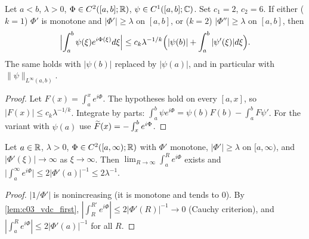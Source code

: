\begin{lemma}
  \label{lem:c03_vdc_interval_amplitude}
  Let $a<b$, $\lambda>0$, $\Phi\in C^2([a,b];\mathbb{R})$, $\psi\in C^1([a,b];\mathbb{C})$. Set $c_1=2$, $c_2=6$. If either ($k=1$) $\Phi'$ is monotone and $|\Phi'|\ge\lambda$ on $[a,b]$, or ($k=2$) $|\Phi''|\ge\lambda$ on $[a,b]$, then
  \[
    \Bigl|\int_a^b\psi(\xi)e^{i\Phi(\xi)}d\xi\Bigr|\le c_k\lambda^{-1/k}\Bigl(|\psi(b)|+\int_a^b|\psi'(\xi)|d\xi\Bigr).
  \]
  The same holds with $|\psi(b)|$ replaced by $|\psi(a)|$, and in particular with $\|\psi\|_{L^\infty(a,b)}$.
\end{lemma}
\begin{proof}
  Let $F(x)=\int_a^xe^{i\Phi}$. The hypotheses hold on every $[a,x]$, so $|F(x)|\le c_k\lambda^{-1/k}$. Integrate by parts:
  $\int_a^b\psi e^{i\Phi}=\psi(b)F(b)-\int_a^bF\psi'$. For the variant with $\psi(a)$ use $\widetilde{F}(x)=-\int_x^be^{i\Phi}$.
\end{proof}

\begin{lemma}
  \label{lem:c03_vdc_halfline}
  Let $a\in\mathbb{R}$, $\lambda>0$, $\Phi\in C^2([a,\infty);\mathbb{R})$ with $\Phi'$ monotone, $|\Phi'|\ge\lambda$ on $[a,\infty)$, and $|\Phi'(\xi)|\to\infty$ as $\xi\to\infty$. Then
  $\lim_{R\to\infty}\int_a^Re^{i\Phi}$ exists and $\bigl|\int_a^\infty e^{i\Phi}\bigr|\le2|\Phi'(a)|^{-1}\le 2\lambda^{-1}$.
\end{lemma}
\begin{proof}
  $|1/\Phi'|$ is nonincreasing (it is monotone and tends to $0$). By \cref{lem:c03_vdc_first}, $|\int_R^{R'}e^{i\Phi}|\le2|\Phi'(R)|^{-1}\to0$ (Cauchy criterion), and $|\int_a^R e^{i\Phi}|\le2|\Phi'(a)|^{-1}$ for all $R$.
\end{proof}

